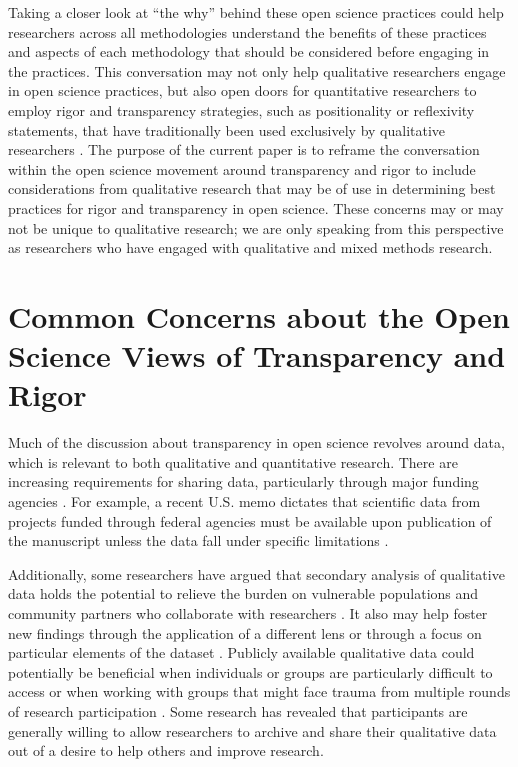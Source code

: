 \documentclass[authordate, meta]{jote-new-article}
\begin{document}
Taking a closer look at “the why” behind these open science practices could help researchers across all methodologies understand the benefits of these practices and aspects of each methodology that should be considered before engaging in the practices. This conversation may not only help qualitative researchers engage in open science practices, but also open doors for quantitative researchers to employ rigor and transparency strategies, such as positionality or reflexivity statements, that have traditionally been used exclusively by qualitative researchers \parencites[e.g.,][]{Jamieson2022}. The purpose of the current paper is to reframe the conversation within the open science movement around transparency and rigor to include considerations from qualitative research that may be of use in determining best practices for rigor and transparency in open science. These concerns may or may not be unique to qualitative research; we are only speaking from this perspective as researchers who have engaged with qualitative and mixed methods research.







\section{Common Concerns about the Open Science Views of Transparency and Rigor}



Much of the discussion about transparency in open science revolves around data, which is relevant to both qualitative and quantitative research. There are increasing requirements for sharing data, particularly through major funding agencies \parencites[e.g.,][]{NIH2020}. For example, a recent U.S. memo dictates that scientific data from projects funded through federal agencies must be available upon publication of the manuscript unless the data fall under specific limitations \parencites{OfficeofScience2022}.



Additionally, some researchers have argued that secondary analysis of qualitative data holds the potential to relieve the burden on vulnerable populations and community partners who collaborate with researchers \parencites[e.g.,][]{Ruggiano2019}. It also may help foster new findings through the application of a different lens or through a focus on particular elements of the dataset \parencites{Long-Sutehall2011}. Publicly available qualitative data could potentially be beneficial when individuals or groups are particularly difficult to access \parencites{Fielding2004} or when working with groups that might face trauma from multiple rounds of research participation \parencites{Ruggiano2019}. Some research has revealed that participants are generally willing to allow researchers to archive and share their qualitative data \parencites[e.g.,][]{Cummings2015}{Mozersky2020}{VandeVusse2022} out of a desire to help others and improve research.
\end{document}
